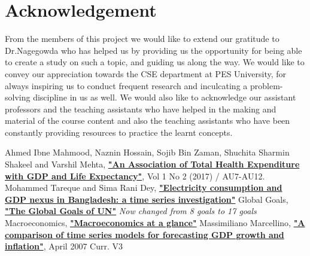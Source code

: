 \documentclass[conference]{IEEEtran}
\begin{document}
\section{Acknowledgement}
From the members of this project we would like to extend our gratitude to Dr.Nagegowda who has helped us by providing us the opportunity for being able to create a study on such a topic, and guiding us along the way.
We would like to convey our appreciation towards the CSE department at PES University, for always inspiring us to conduct frequent research and inculcating a problem-solving discipline in us as well.
We would also like to acknowledge our assistant professors and the teaching assistants who have helped in the making and material of the course content and also the teaching assistants who have been constantly providing resources to practice the learnt concepts.
\begin{thebibliography}{00}
     Ahmed Ibne Mahmood, Naznin Hossain, Sojib Bin Zaman,  Shuchita Sharmin Shakeel and Varshil Mehta,  \textbf{\href{https://jmrionline.com/jmri/article/view/72/86}{"An Association of Total Health Expenditure with GDP and Life Expectancy"}}, Vol 1 No 2 (2017) / AU7-AU12.
     Mohammed Tareque and Sima Rani Dey, \textbf{\href{https://www.emerald.com/insight/content/doi/10.1108/JABES-04-2019-0029/full/pdf}{"Electricity consumption and GDP nexus in Bangladesh: a time series investigation"}}
     Global Goals, \textbf{\href{https://www.globalgoals.org/goals/}{"The Global Goals of UN"}} \emph{Now changed from 8 goals to 17 goals}
     Macroeconomics, \textbf{\href{https://www.worldbank.org/en/topic/macroeconomics/overview}{"Macroeconomics at a glance"}}
     Massimiliano Marcellino, \textbf{\href{https://www.researchgate.net/profile/Niels-Haldrup/publication/228650389_A_comparison_of_time_series_models_for_forecasting_GDP_growth_and_inflation/links/0c96051b6b0d0e7951000000/A-comparison-of-time-series-models-for-forecasting-GDP-growth-and-inflation.pdf}{"A comparison of time series models for forecasting GDP growth and inflation"}}, April 2007 Curr. V3
\end{thebibliography}
\end{document}
